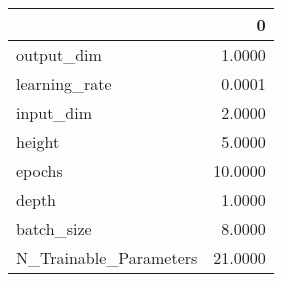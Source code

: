 \begin{tabular}{lr}
\toprule
{} &        0 \\
\midrule
output\_dim             &   1.0000 \\
learning\_rate          &   0.0001 \\
input\_dim              &   2.0000 \\
height                 &   5.0000 \\
epochs                 &  10.0000 \\
depth                  &   1.0000 \\
batch\_size             &   8.0000 \\
N\_Trainable\_Parameters &  21.0000 \\
\bottomrule
\end{tabular}
